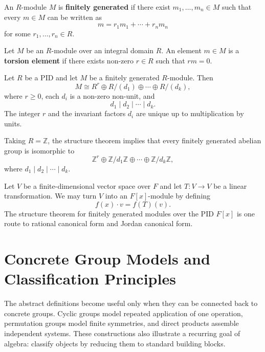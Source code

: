 \begin{definition}
An $R$-module $M$ is \textbf{finitely generated} if there exist $m_1,\dots,m_n\in M$ such that every $m\in M$ can be written as
\[
    m=r_1m_1+\cdots+r_nm_n
\]
for some $r_1,\dots,r_n\in R$.
\end{definition}

\begin{definition}
Let $M$ be an $R$-module over an integral domain $R$. An element $m\in M$ is a \textbf{torsion element} if there exists non-zero $r\in R$ such that $rm=0$.
\end{definition}

\newpage

\begin{theorem}
Let $R$ be a PID and let $M$ be a finitely generated $R$-module. Then
\[
    M\cong R^r\oplus R/(d_1)\oplus\cdots\oplus R/(d_k),
\]
where $r\geq 0$, each $d_i$ is a non-zero non-unit, and
\[
    d_1\mid d_2\mid\cdots\mid d_k.
\]
The integer $r$ and the invariant factors $d_i$ are unique up to multiplication by units.
\end{theorem}

\begin{example}
Taking $R=\mathbb{Z}$, the structure theorem implies that every finitely generated abelian group is isomorphic to
\[
    \mathbb{Z}^r\oplus \mathbb{Z}/d_1\mathbb{Z}\oplus\cdots\oplus\mathbb{Z}/d_k\mathbb{Z},
\]
where $d_1\mid d_2\mid\cdots\mid d_k$.
\end{example}

\begin{example}
Let $V$ be a finite-dimensional vector space over $F$ and let $T:V\to V$ be a linear transformation. We may turn $V$ into an $F[x]$-module by defining
\[
    f(x)\cdot v=f(T)(v).
\]
The structure theorem for finitely generated modules over the PID $F[x]$ is one route to rational canonical form and Jordan canonical form.
\end{example}


\section{Concrete Group Models and Classification Principles}

The abstract definitions become useful only when they can be connected back to concrete groups. Cyclic groups model repeated application of one operation, permutation groups model finite symmetries, and direct products assemble independent systems. These constructions also illustrate a recurring goal of algebra: classify objects by reducing them to standard building blocks.

